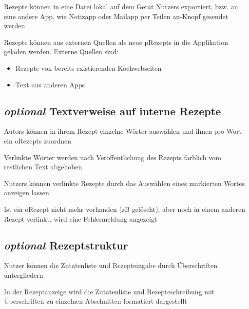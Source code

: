 		Rezepte können in eine Datei \gls{lokal} auf dem Gerät  \gls{Nutzer}s exportiert, bzw. an eine andere App, wie Notizapp oder Mailapp per Teilen an-Knopf gesendet werden
		
		Rezepte können aus externen Quellen als neue \glspl{pRezept} in die Applikation geladen werden. Externe Quellen sind:
		\begin{itemize}[nosep]
					\item Rezepte von bereits existierenden Kochwebseiten
					\item Text aus anderen Apps
				\end{itemize}

	
	\subsection{{\em optional} Textverweise auf interne Rezepte}
	
		\glspl{Autor} können in ihrem Rezept einzelne Wörter auswählen und ihnen pro Wort ein \glspl{oRezept} zuordnen
		
		
		Verlinkte Wörter werden nach Veröffentlichung des Rezepts farblich vom restlichen Text abgehoben
		
		\Glspl{Nutzer} können verlinkte Rezepte durch das Auswählen eines markierten Wortes anzeigen lassen
		
		Ist ein \gls{oRezept} nicht mehr vorhanden (zB gelöscht), aber noch in einem anderen Rezept verlinkt, wird eine Fehlermeldung angezeigt
		
		\subsection{{\em optional} Rezeptstruktur}
	  Nutzer können die Zutatenliste und Rezepteingabe durch Überschriften untergliedern
		
		In der Rezeptanzeige wird die Zutatenliste und Rezepteschreibung mit Überschriften zu einzelnen Abschnitten   formatiert dargestellt 
		

